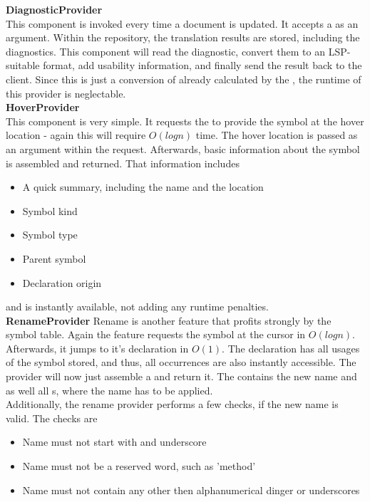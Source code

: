 \textbf{DiagnosticProvider}\\
This component is invoked every time a document is updated.
It accepts a  as an argument.
Within the repository, the translation results are stored, including the diagnostics.
This component will read the diagnostic, convert them to an LSP-suitable format, add usability information, and finally send the result back to the client.
Since this is just a conversion of already calculated  by the , the runtime of this provider is neglectable.\\

\textbf{HoverProvider}\\
This component is very simple.
It requests the  to provide the symbol at the hover location - again this will require $O(logn)$ time.
The hover location is passed as an argument within the request.
Afterwards, basic information about the symbol is assembled and returned.
That information includes
\begin{itemize}
    \item A quick summary, including the name and the location
    \item Symbol kind
    \item Symbol type
    \item Parent symbol
    \item Declaration origin
\end{itemize}
and is instantly available, not adding any runtime penalties.\\

\textbf{RenameProvider}
Rename is another feature that profits strongly by the symbol table.
Again the feature requests the symbol at the cursor in $O(logn)$.
Afterwards, it jumps to it's declaration in $O(1)$.
The declaration has all usages of the symbol stored, and thus, all occurrences are also instantly accessible.
The provider will now just assemble a  and return it.
The  contains the new name and as well all s, where the name has to be applied.\\

Additionally, the rename provider performs a few checks, if the new name is valid.
The checks are
\begin{itemize}
    \item Name must not start with and underscore
    \item Name must not be a reserved word, such as 'method'
    \item Name must not contain any other then alphanumerical dinger or underscores
\end{itemize}


